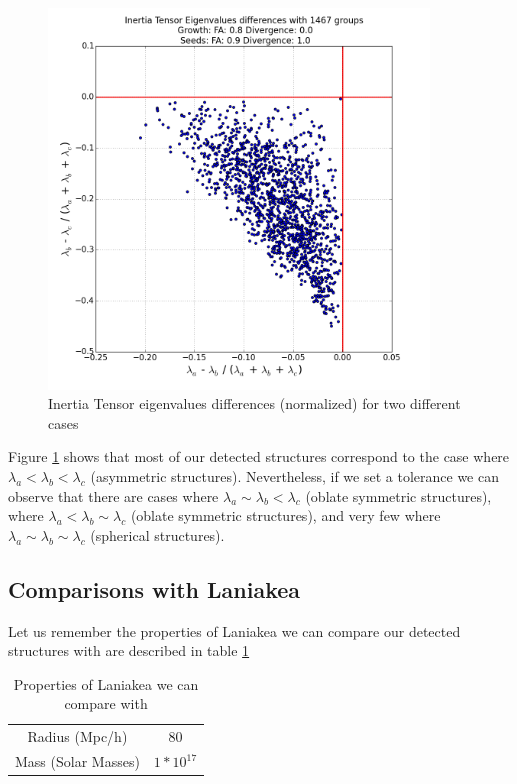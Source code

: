 \documentclass[12pt]{article}
\begin{document}
\begin{figure}[ht]
\begin{minipage}{.5\textwidth}
  \includegraphics[width=0.9\textwidth]{groups/inertiaplots/inertia_diff_09_Trace_10_search_FA_08_Trace_00.png}
\end{minipage}
\caption{Inertia Tensor eigenvalues differences (normalized) for two different cases}
\label{fg:inertia_diff}
\end{figure}
\FloatBarrier

\begin{par}
Figure \ref{fg:inertia_diff} shows that most of our
 detected structures correspond to the case where
  $\lambda_a < \lambda_b < \lambda_c$ (asymmetric
   structures). Nevertheless, if we set a tolerance we
    can observe that there are cases where $\lambda_a
     \sim \lambda_b < \lambda_c$ (oblate symmetric
      structures), where $\lambda_a < \lambda_b \sim
       \lambda_c$ (oblate symmetric structures), and very
        few where $\lambda_a \sim \lambda_b \sim
         \lambda_c$ (spherical structures).
\end{par}

\subsection{Comparisons with Laniakea}
\begin{par}
 Let us remember the properties of Laniakea we can compare our detected structures with are described in table \ref{tab:laniakea}
\end{par}
\begin{table}[ht]
    \centering
    \begin{tabular}{|c|c|}
        Radius (Mpc/h) & 80  \\
        Mass (Solar Masses) & $1*10^{17}$  \\
    \end{tabular}
    \caption{Properties of Laniakea we can compare with}
    \label{tab:laniakea}
\end{table}
\FloatBarrier
\end{document}
